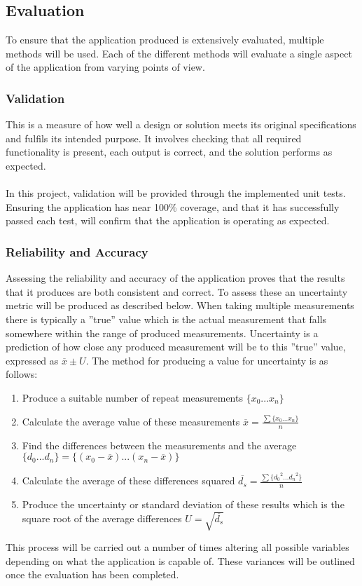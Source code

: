	\subsection{Evaluation}\label{sec:methodology_evaluation}
		To ensure that the application produced is extensively evaluated, multiple methods will be used. Each of the different methods will evaluate a single aspect of the application from varying points of view.
		\subsubsection{Validation}
			This is a measure of how well a design or solution meets its original specifications and fulfils its intended purpose. It involves checking that all required functionality is present, each output is correct, and the solution performs as expected.
			\\\\
			In this project, validation will be provided through the implemented unit tests. Ensuring the application has near 100\% coverage, and that it has successfully passed each test, will confirm that the application is operating as expected.
		\subsubsection{Reliability and Accuracy}
			Assessing the reliability and accuracy of the application proves that the results that it produces are both consistent and correct. To assess these an uncertainty metric will be produced as described below. When taking multiple measurements there is typically a ”true” value which is the actual measurement that falls somewhere within the range of produced measurements. Uncertainty is a prediction of how close any produced measurement will be to this ”true” value, expressed as $\overline{x} \pm U$. The method for producing a value for uncertainty is as follows:
			\begin{enumerate}
				\item Produce a suitable number of repeat measurements $\{x_0 ... x_n\}$
				\item Calculate the average value of these measurements $\overline{x}=\frac{\sum\{x_0...x_n\}}{n}$
				\item Find the differences between the measurements and the average $\{d_0...d_n\} = \{(x_0-\overline{x})...(x_n-\overline{x})\}$
				\item Calculate the average of these differences squared $\overline{d_s} = \frac{\sum\{{d_0}^2...{d_n}^2\}}{n}$
				\item Produce the uncertainty or standard deviation of these results which is the square root of the average differences $U= \sqrt{\overline{d_s}}$
			\end{enumerate}
			This process will be carried out a number of times altering all possible variables depending on what the application is capable of. These variances will be outlined once the evaluation has been completed.
